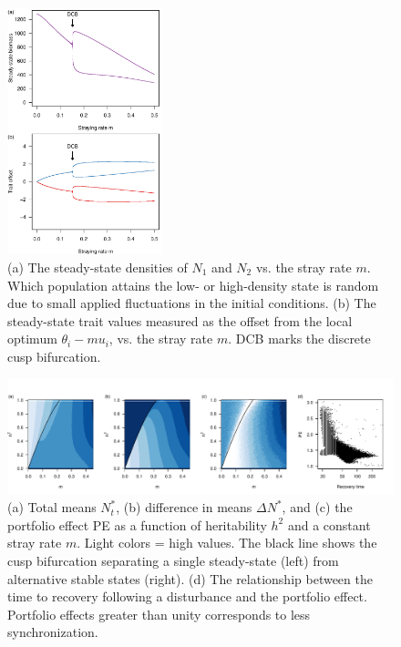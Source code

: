\documentclass{revtex4}
\begin{document}
\begin{figure}
  \captionsetup{justification=raggedright,
singlelinecheck=false
}
\centering
\includegraphics[width=0.4\textwidth]{fig_traj.pdf}
\caption{
(a) The steady-state densities of $N_1$ and $N_2$ vs. the stray rate $m$. Which population attains the low- or high-density state is random due to small applied fluctuations in the initial conditions.
(b) The steady-state trait values measured as the offset from the local optimum $\theta_i - mu_i$, vs. the stray rate $m$. 
DCB marks the discrete cusp bifurcation.
} \label{fig:traj}
\end{figure}


\begin{figure}
  \captionsetup{justification=raggedright,
singlelinecheck=false
}
\centering
\includegraphics[width=1\textwidth]{fig_MDPE_hm.pdf}
\caption{
(a) Total means $N_t^*$, 
(b) difference in means $\Delta N^*$, and 
(c) the portfolio effect PE as a function of heritability $h^2$ and a constant stray rate $m$. Light colors = high values.
The black line shows the cusp bifurcation separating a single steady-state (left) from alternative stable states (right).
(d) The relationship between the time to recovery following a disturbance and the portfolio effect. Portfolio effects greater than unity corresponds to less synchronization.
} \label{fig:PE}
\end{figure}
\end{document}
